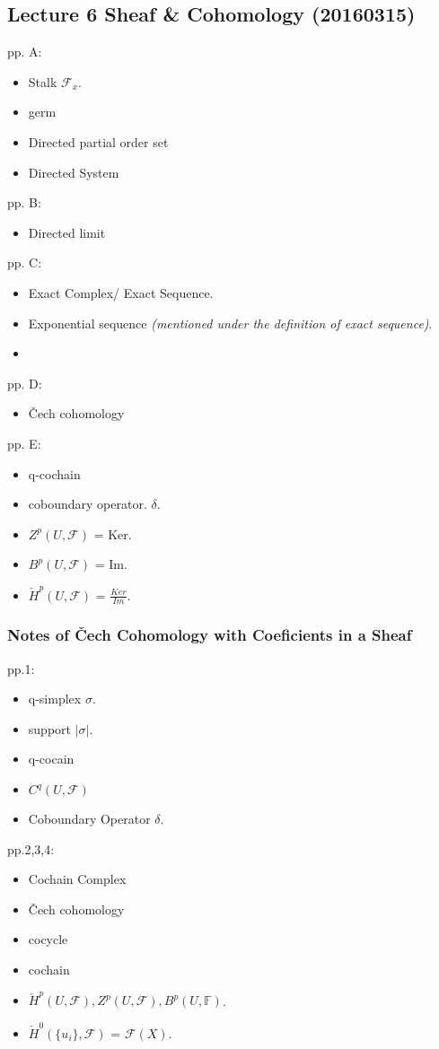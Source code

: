 \documentclass{article}
\numberwithin{equation}{subsection} %
\begin{document}
	\subsection{Lecture 6 Sheaf \& Cohomology (20160315)}
	pp. A:
		\begin{itemize}
			\item Stalk $\mathcal{F}_x$.
			\item germ
			\item Directed partial order set
			\item Directed System
		\end{itemize}
	pp. B:
		\begin{itemize}
			\item Directed limit
		\end{itemize}
	pp. C:
	\begin{itemize}
		\item Exact Complex/ Exact Sequence.
		\item Exponential sequence \textit{(mentioned under the definition of exact sequence)}.
		\item
	\end{itemize}
	pp. D:
	\begin{itemize}
		\item Čech cohomology
	\end{itemize}
	pp. E:
	\begin{itemize}
		\item q-cochain
		\item coboundary operator. $\delta$.
		\item $Z^p(U,\mathcal{F})$ = Ker.
		\item $B^p(U,\mathcal{F})$ = Im.
		\item $\check{H}^p(U,\mathcal{F})$ = $\frac{Ker}{Im}$.
	\end{itemize}
		\subsubsection{Notes of Čech Cohomology with Coeficients in a Sheaf}
		pp.1:
		\begin{itemize}
			\item q-simplex $\sigma$.
			\item support $|\sigma|$.
			\item q-cocain
			\item $C^q(U,\mathcal{F})$
			\item Coboundary Operator $\delta$.
		\end{itemize}
		pp.2,3,4:
		\begin{itemize}
			\item Cochain Complex
			\item Čech cohomology
			\item cocycle
			\item cochain
			\item $\check{H}^p(U,\mathcal{F}),Z^p(U,\mathcal{F}),B^p(U,\mathbb{F})$.
			\item $\check{H}^0(\{u_i\},\mathcal{F})$ = $\mathcal{F}(X)$.
		\end{itemize}
	
\end{document}
